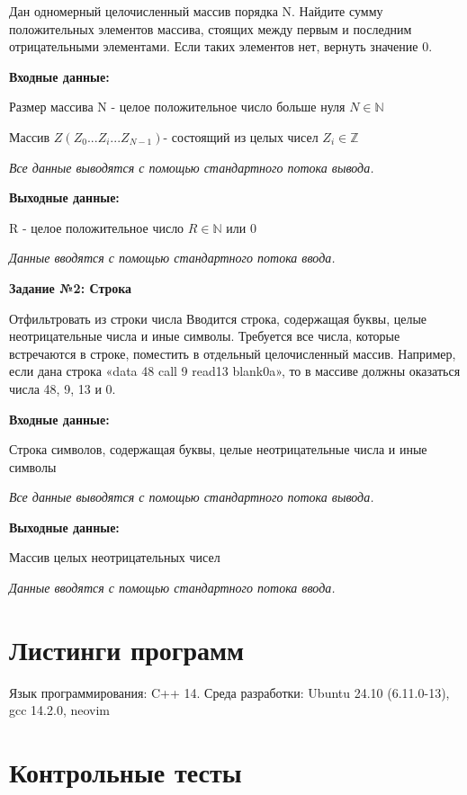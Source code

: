 \documentclass[a4paper,12pt]{article}
\begin{document}
	Дан одномерный целочисленный массив порядка N. Найдите сумму положительных элементов массива, стоящих между первым и последним отрицательными элементами. 
	Если таких элементов нет, вернуть значение 0.
	
	\textbf{Входные данные:}
	
	Размер массива N - целое положительное число больше нуля $N\in\mathbb{N}$
	
	Массив $Z (Z_{0}...Z_{i}...Z_{N-1})$- состоящий из целых чисел $Z_{i}\in\mathbb{Z}$
	
	\textit{Все данные выводятся с помощью стандартного потока вывода.}
	
	\textbf{Выходные данные:}
	
	R - целое положительное число $R\in\mathbb{N}$ или 0 
	
	\textit{Данные вводятся с помощью стандартного потока ввода.}
	
	\textbf{Задание №2: Строка}
	
	Отфильтровать из строки числа
	Вводится строка, содержащая буквы, целые неотрицательные числа и иные символы. Требуется все числа, которые встречаются в строке, поместить в отдельный целочисленный массив. Например, если дана строка «data 48 call 9 read13 blank0a», то в массиве должны оказаться числа 48, 9, 13 и 0.
	
	\textbf{Входные данные:}
	
	Строка символов, содержащая буквы, целые неотрицательные числа и иные символы
	
	\textit{Все данные выводятся с помощью стандартного потока вывода.}
	
	\textbf{Выходные данные:}
	
	Массив целых неотрицательных чисел
	
	\textit{Данные вводятся с помощью стандартного потока ввода.}
	
	\newpage
	\section{Листинги программ}
	Язык программирования: C++ 14. Среда разработки: Ubuntu 24.10 (6.11.0-13), gcc 14.2.0, neovim
	
	
	
	
	\newpage
	\section{Контрольные тесты}
	
\end{document}
